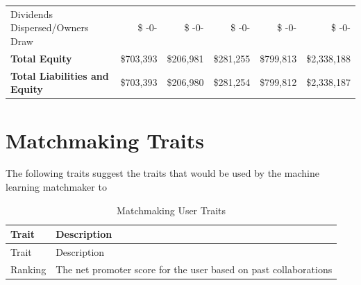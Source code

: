 \documentclass[11pt,openany]{book}
\begin{document}
\begin{landscape}
\begin{center}
\begin{longtable}[]{@{}lrrrrr@{}}
      \hspace{3mm} Dividends Dispersed/Owners Draw & \$ -0- & \$ -0- & \$ -0- & \$ -0- & \$ -0- \\
      \hfill \textbf{Total Equity} & \$703,393 & \$206,981 & \$281,255 & \$799,813 & \$2,338,188 \\
      \textbf{Total Liabilities and Equity} & \$703,393 & \$206,980 & \$281,254 & \$799,812 & \$2,338,187 \\
      \bottomrule
    \end{longtable}
  \end{center}
\end{landscape}

\hypertarget{matchmaking-traits}{%
\section{Matchmaking Traits}\label{matchmaking-traits}}

The following traits suggest the traits that would be used by the
machine learning matchmaker to

\begin{longtable}[]{@{}ll@{}}
\caption{Matchmaking User Traits}\tabularnewline
\toprule
Trait & Description\tabularnewline
\midrule
\endfirsthead
\toprule
Trait & Description\tabularnewline
\midrule
\endhead
Ranking & The net promoter score for the user based on past
collaborations\tabularnewline
\bottomrule
\end{longtable}
\end{document}
